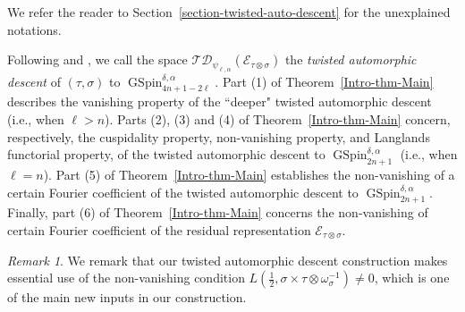\documentclass[12pt]{amsart}
\newcommand{\TD}{\mathcal{TD}}
\newcommand{\CE}{{\mathcal{E}}}
\theoremstyle{remark}
\newtheorem{remark}[theorem]{Remark}%
\DeclareMathOperator{\GSpin}{GSpin}
\begin{document}
We refer the reader to Section~\ref{section-twisted-auto-descent} for the unexplained notations. 

Following \cite{JiangLiuXuZhang2016} and \cite{JiangZhang2020Annals}, we call the space $\TD_{\psi_{\ell,\alpha}}(\CE_{\tau\otimes \sigma})$ the \textit{twisted automorphic descent} of $(\tau, \sigma)$ to $\GSpin_{4n+1-2\ell}^{\delta,\alpha}$. Part (1) of Theorem~\ref{Intro-thm-Main}  describes the vanishing property of the ``deeper" twisted automorphic descent (i.e., when $\ell>n$). Parts (2), (3) and (4) of Theorem~\ref{Intro-thm-Main} concern, respectively, the cuspidality property, non-vanishing property, and Langlands functorial property, of the twisted automorphic descent to $\GSpin_{2n+1}^{\delta,\alpha}$ (i.e., when $\ell=n$). Part (5) of Theorem~\ref{Intro-thm-Main} establishes the non-vanishing of a certain Fourier coefficient of the twisted automorphic descent to $\GSpin_{2n+1}^{\delta,\alpha}$. Finally, part (6) of Theorem~\ref{Intro-thm-Main} concerns the non-vanishing of certain Fourier coefficient of the residual representation $\CE_{\tau\otimes\sigma}$. 

\begin{remark}
We remark that our twisted automorphic descent construction makes essential use of the non-vanishing condition $L(\frac{1}{2},\sigma\times\tau\otimes \omega_{\sigma}^{-1})\not=0$, which is one of the main new inputs in our construction.
\end{remark}
\end{document}

